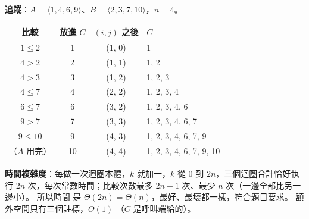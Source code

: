 \begin{pastsoln}
\textbf{追蹤}：$A = \langle 1, 4, 6, 9 \rangle$、$B = \langle 2, 3, 7, 10 \rangle$，$n = 4$。
\begin{center}
\small
\begin{tabular}{cccl}
\toprule
比較 & 放進 $C$ & $(i, j)$ 之後 & $C$ \\
\midrule
$1 \le 2$ & 1 & (1, 0) & 1 \\
$4 > 2$ & 2 & (1, 1) & 1, 2 \\
$4 > 3$ & 3 & (1, 2) & 1, 2, 3 \\
$4 \le 7$ & 4 & (2, 2) & 1, 2, 3, 4 \\
$6 \le 7$ & 6 & (3, 2) & 1, 2, 3, 4, 6 \\
$9 > 7$ & 7 & (3, 3) & 1, 2, 3, 4, 6, 7 \\
$9 \le 10$ & 9 & (4, 3) & 1, 2, 3, 4, 6, 7, 9 \\
（$A$ 用完） & 10 & (4, 4) & 1, 2, 3, 4, 6, 7, 9, 10 \\
\bottomrule
\end{tabular}
\end{center}

\textbf{時間複雜度}：每做一次迴圈本體，$k$ 就加一，$k$ 從 $0$ 到 $2n$，三個迴圈合計恰好執行
$2n$ 次，每次常數時間；比較次數最多 $2n - 1$ 次、最少 $n$ 次（一邊全部比另一邊小）。 所以時間
是 $\Theta(2n) = \Theta(n)$，最好、最壞都一樣，符合題目要求。 額外空間只有三個註標，$O(1)$
（$C$ 是呼叫端給的）。
\end{pastsoln}
